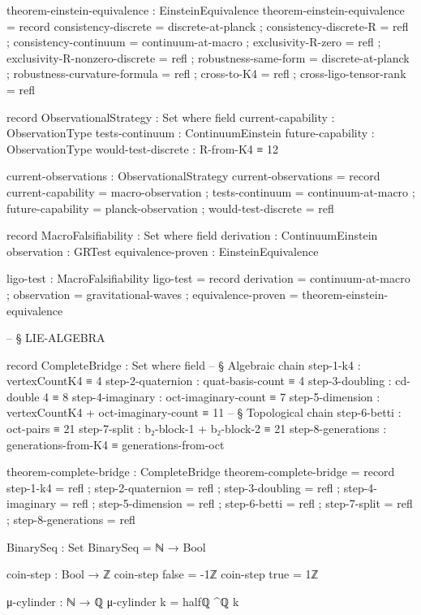 \documentclass[11pt,a4paper]{book}
\begin{document}
\begin{code}
theorem-einstein-equivalence : EinsteinEquivalence
theorem-einstein-equivalence = record
  { consistency-discrete = discrete-at-planck
  ; consistency-discrete-R = refl
  ; consistency-continuum = continuum-at-macro
  ; exclusivity-R-zero = refl
  ; exclusivity-R-nonzero-discrete = refl
  ; robustness-same-form = discrete-at-planck
  ; robustness-curvature-formula = refl
  ; cross-to-K4 = refl
  ; cross-ligo-tensor-rank = refl
  }

record ObservationalStrategy : Set where
  field
    current-capability : ObservationType
    tests-continuum : ContinuumEinstein
    future-capability : ObservationType
    would-test-discrete : R-from-K4 ≡ 12

current-observations : ObservationalStrategy
current-observations = record
  { current-capability = macro-observation
  ; tests-continuum = continuum-at-macro
  ; future-capability = planck-observation
  ; would-test-discrete = refl
  }

record MacroFalsifiability : Set where
  field
    derivation : ContinuumEinstein
    observation : GRTest
    equivalence-proven : EinsteinEquivalence

ligo-test : MacroFalsifiability
ligo-test = record
  { derivation = continuum-at-macro
  ; observation = gravitational-waves
  ; equivalence-proven = theorem-einstein-equivalence
  }


-- § LIE-ALGEBRA

record CompleteBridge : Set where
  field
    -- § Algebraic chain
    step-1-k4         : vertexCountK4 ≡ 4
    step-2-quaternion  : quat-basis-count ≡ 4
    step-3-doubling    : cd-double 4 ≡ 8
    step-4-imaginary   : oct-imaginary-count ≡ 7
    step-5-dimension   : vertexCountK4 + oct-imaginary-count ≡ 11
    -- § Topological chain
    step-6-betti       : oct-pairs ≡ 21
    step-7-split       : b₂-block-1 + b₂-block-2 ≡ 21
    step-8-generations : generations-from-K4 ≡ generations-from-oct

theorem-complete-bridge : CompleteBridge
theorem-complete-bridge = record
  { step-1-k4         = refl
  ; step-2-quaternion  = refl
  ; step-3-doubling    = refl
  ; step-4-imaginary   = refl
  ; step-5-dimension   = refl
  ; step-6-betti       = refl
  ; step-7-split       = refl
  ; step-8-generations = refl
  }

BinarySeq : Set
BinarySeq = ℕ → Bool

coin-step : Bool → ℤ
coin-step false = -1ℤ
coin-step true  = 1ℤ

μ-cylinder : ℕ → ℚ
μ-cylinder k = halfℚ ^ℚ k


\end{code}
\end{document}

